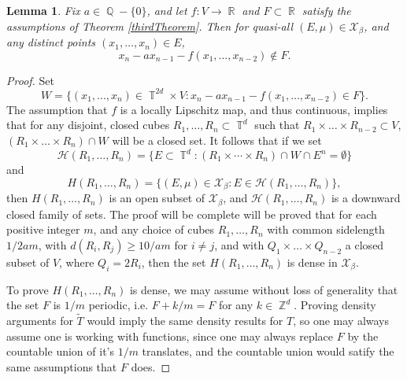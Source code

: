 \documentclass[dvipsnames,letterpaper,12pt]{article}
\numberwithin{equation}{section}
\DeclareMathOperator{\RR}{\mathbb{R}}
\DeclareMathOperator{\ZZ}{\mathbb{Z}}
\DeclareMathOperator{\QQ}{\mathbb{Q}}
\DeclareMathOperator{\TT}{\mathbb{T}}
\newtheorem{lemma}[theorem]{Lemma}
\numberwithin{theorem}{section}
\begin{document}
\begin{lemma}
    Fix $a \in \QQ - \{ 0 \}$, and let $f: V \to \RR$ and $F \subset \RR$ satisfy the assumptions of Theorem \ref{thirdTheorem}. Then for quasi-all $(E,\mu) \in \mathcal{X}_\beta$, and any distinct points $(x_1,\dots,x_n) \in E$,
    \[ x_n - ax_{n-1} - f(x_1,\dots,x_{n-2}) \not \in F. \]
\end{lemma}
\begin{proof}
    Set
    \[ W = \{ (x_1,\dots,x_n) \in \TT^{2d} \times V : x_n - ax_{n-1} - f(x_1,\dots,x_{n-2}) \in F \}. \]
    The assumption that $f$ is a locally Lipschitz map, and thus continuous, implies that for any disjoint, closed cubes $R_1,\dots,R_n \subset \TT^d$ such that $R_1 \times \dots \times R_{n-2} \subset V$, $(R_1 \times \dots \times R_n) \cap W$ will be a closed set. It follows that if we set
    \[ \mathcal{H}(R_1,\dots,R_n) = \{ E \subset \TT^d : (R_1 \times \cdots \times R_n) \cap W \cap E^n = \emptyset \} \]
    and
    \[ H(R_1,\dots,R_n) = \{ (E,\mu) \in \mathcal{X}_\beta: E \in \mathcal{H}(R_1,\dots,R_n) \}, \]
    then $H(R_1,\dots,R_n)$ is an open subset of $\mathcal{X}_\beta$, and $\mathcal{H}(R_1,\dots,R_n)$ is a downward closed family of sets. The proof will be complete will be proved that for each positive integer $m$, and any choice of cubes $R_1,\dots,R_n$ with common sidelength $1/2am$, with $d(R_i,R_j) \geq 10/am$ for $i \neq j$, and with $Q_1 \times \dots \times Q_{n-2}$ a closed subset of $V$, where $Q_i = 2R_i$, then the set $H(R_1,\dots,R_n)$ is dense in $\mathcal{X}_\beta$.

    To prove $H(R_1,\dots,R_n)$ is dense, we may assume without loss of generality that the set $F$ is $1/m$ periodic, i.e. $F + k / m = F$ for any $k \in \ZZ^d$. Proving density arguments for $\tilde{T}$ would imply the same density results for $T$, so one may always assume one is working with functions, since one may always replace $F$ by the countable union of it's $1/m$ translates, and the countable union would satify the same assumptions that $F$ does.


\end{proof}
\end{document}
